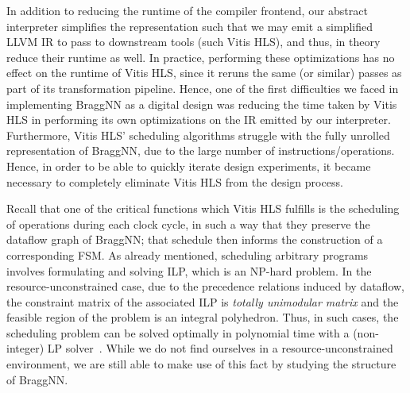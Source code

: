 {In addition to reducing the runtime of the compiler frontend, our abstract interpreter simplifies the representation such that we may emit a simplified LLVM IR to pass to downstream tools (such Vitis HLS), and thus, in theory reduce their runtime as well.
In practice, performing these optimizations has no effect on the runtime of Vitis HLS, since it reruns the same (or similar) passes as part of its transformation pipeline.
Hence, one of the first difficulties we faced in implementing BraggNN as a digital design was reducing the time taken by Vitis HLS in performing its own optimizations on the IR emitted by our interpreter. 
Furthermore, Vitis HLS' scheduling algorithms struggle with the fully unrolled representation of BraggNN, due to the large number of instructions/operations.
Hence, in order to be able to quickly iterate design experiments, it became necessary to completely eliminate Vitis HLS from the design process.

Recall that one of the critical functions which Vitis HLS fulfills is the scheduling of operations during each clock cycle, in such a way that they preserve the dataflow graph of BraggNN; that schedule then informs the construction of a corresponding FSM.
As already mentioned, scheduling arbitrary programs involves formulating and solving ILP, which is an NP-hard problem.
In the resource-unconstrained case, due to the precedence relations induced by dataflow, the constraint matrix of the associated ILP is \emph{totally unimodular matrix} and the feasible region of the problem is an integral polyhedron. 
Thus, in such cases, the scheduling problem can be solved optimally in polynomial time with a (non-integer) LP solver~\cite{tuprints9272}.
While we do not find ourselves in a resource-unconstrained environment, we are still able to make use of this fact by studying the structure of BraggNN.

}
